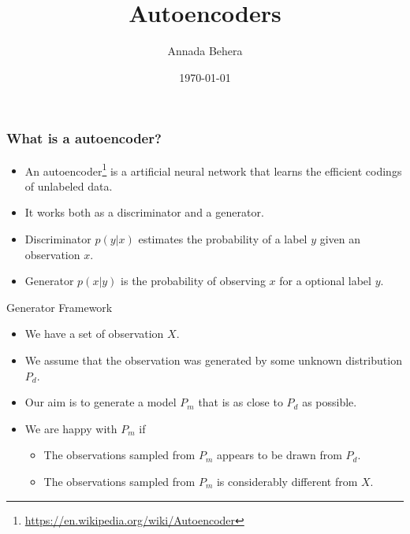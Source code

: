 \documentclass{beamer}
\title{Autoencoders}
\author[Annada]{Annada Behera}
\date{\today}
\begin{document}
\begin{frame}
	\titlepage
\end{frame}

\begin{frame}
	\frametitle{What is a autoencoder?}
	\begin{itemize}
	\item An autoencoder\footnote{\url{https://en.wikipedia.org/wiki/Autoencoder}} is a artificial neural network that learns the efficient codings
	of unlabeled data.
	\item It works both as a discriminator and a generator.
	\end{itemize}
\end{frame}

\begin{frame}
	\begin{definition}
	\begin{itemize}

	\item Discriminator $p(y|x)$ estimates the probability of a label $y$ given an
	observation $x$.
	\item Generator $p(x|y)$ is the probability of observing $x$ for a optional label $y$.
	\end{itemize}
	\end{definition}
\end{frame}

\begin{frame}
	\begin{block}{Generator Framework}
	\begin{itemize}
		\item We have a set of observation $X$.
		\item We assume that the observation was generated by some unknown
		distribution $P_d$.
		\item Our aim is to generate a model $P_m$ that is as close to $P_d$
		as possible.
		\item We are happy with $P_m$ if
		\begin{itemize}
			\item The observations sampled from $P_m$ appears to be
			drawn from $P_d$.
			\item The observations sampled from $P_m$ is considerably
			different from $X$.
		\end{itemize}
	\end{itemize}
	\end{block}
\end{frame}
\end{document}

